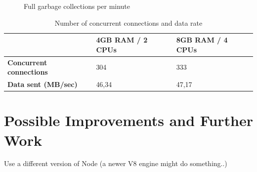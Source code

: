 \begin{figure}[h!]
	\centering
	 \hfill
	\caption{Full garbage collections per minute}
\end{figure}

\begin{table}[h!]
\centering
\begin{tabular}{lll}
\hline
	& \textbf{4GB RAM / 2 CPUs}	&	\textbf{8GB RAM / 4 CPUs} \\ \hline
\textbf{Concurrent connections}	& 304	& 333 \\
\textbf{Data sent (MB/sec)}	& 46,34	& 47,17 \\
\hline                         
\end{tabular}
\caption{Number of concurrent connections and data rate}
\label{table:connectionsDatarate}
\end{table}



\section{Possible Improvements and Further Work}

Use a different version of Node (a newer V8 engine might do something..)


